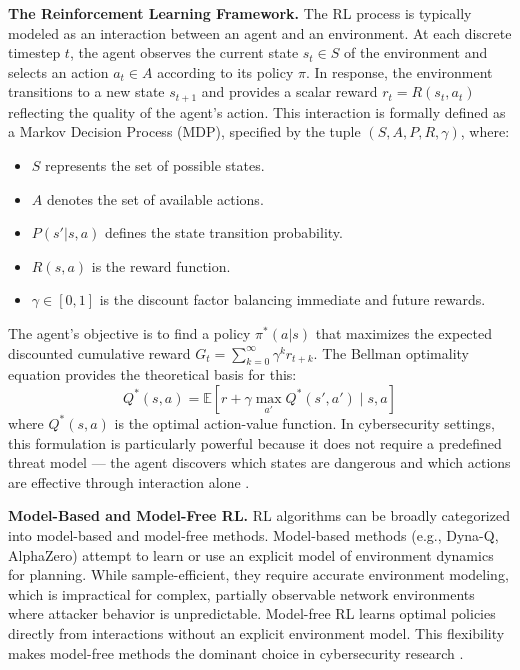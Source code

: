 \documentclass[12pt,a4paper]{report}
\begin{document}
\textbf{The Reinforcement Learning Framework.} The RL process is typically modeled as an interaction between an agent and an environment. At each discrete timestep $t$, the agent observes the current state $s_t \in S$ of the environment and selects an action $a_t \in A$ according to its policy $\pi$. In response, the environment transitions to a new state $s_{t+1}$ and provides a scalar reward $r_t = R(s_t, a_t)$ reflecting the quality of the agent's action. This interaction is formally defined as a Markov Decision Process (MDP), specified by the tuple $(S, A, P, R, \gamma)$, where:
\begin{itemize}
  \item $S$ represents the set of possible states.
  \item $A$ denotes the set of available actions.
  \item $P(s'|s, a)$ defines the state transition probability.
  \item $R(s, a)$ is the reward function.
  \item $\gamma \in [0, 1]$ is the discount factor balancing immediate and future rewards.
\end{itemize}

The agent's objective is to find a policy $\pi^*(a|s)$ that maximizes the expected discounted cumulative reward $G_t = \sum_{k=0}^{\infty} \gamma^k r_{t+k}$. The Bellman optimality equation provides the theoretical basis for this:
\begin{equation}
  Q^*(s, a) = \mathbb{E}\left[r + \gamma \max_{a'} Q^*(s', a') \mid s, a\right]
\end{equation}
where $Q^*(s, a)$ is the optimal action-value function. In cybersecurity settings, this formulation is particularly powerful because it does not require a predefined threat model --- the agent discovers which states are dangerous and which actions are effective through interaction alone \cite{suttonBarto2018}.

\textbf{Model-Based and Model-Free RL.} RL algorithms can be broadly categorized into model-based and model-free methods. Model-based methods (e.g., Dyna-Q, AlphaZero) attempt to learn or use an explicit model of environment dynamics for planning. While sample-efficient, they require accurate environment modeling, which is impractical for complex, partially observable network environments where attacker behavior is unpredictable. Model-free RL learns optimal policies directly from interactions without an explicit environment model. This flexibility makes model-free methods the dominant choice in cybersecurity research \cite{nguyen2021deep}.
\end{document}

